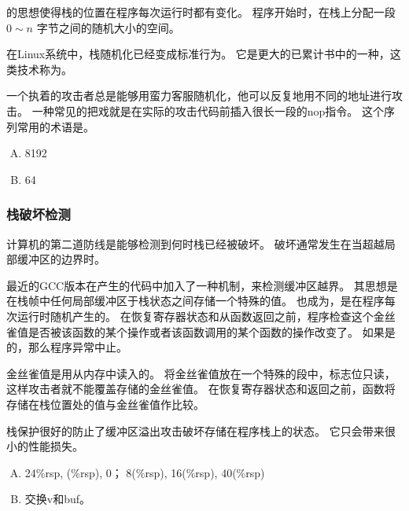 {{{            的思想使得栈的位置在程序每次运行时都有变化。
            程序开始时，在栈上分配一段 $0 \sim n$ 字节之间的随机大小的空间。

            在Linux系统中，栈随机化已经变成标准行为。
            它是更大的已累计书中的一种，这类技术称为。

            一个执着的攻击者总是能够用蛮力客服随机化，他可以反复地用不同的地址进行攻击。
            一种常见的把戏就是在实际的攻击代码前插入很长一段的nop指令。
            这个序列常用的术语是。

            \begin{practicec}
                \begin{enumerate}[A.]
                    \item 8192
                    \item 64
                \end{enumerate}
            \end{practicec}
        }

        \subsubsection{栈破坏检测}
        {
            计算机的第二道防线是能够检测到何时栈已经被破坏。
            破坏通常发生在当超越局部缓冲区的边界时。

            最近的GCC版本在产生的代码中加入了一种机制，来检测缓冲区越界。
            其思想是在栈帧中任何局部缓冲区于栈状态之间存储一个特殊的值。
            也成为，是在程序每次运行时随机产生的。
            在恢复寄存器状态和从函数返回之前，程序检查这个金丝雀值是否被该函数的某个操作或者该函数调用的某个函数的操作改变了。
            如果是的，那么程序异常中止。

            金丝雀值是用从内存中读入的。
            将金丝雀值放在一个特殊的段中，标志位只读，这样攻击者就不能覆盖存储的金丝雀值。
            在恢复寄存器状态和返回之前，函数将存储在栈位置处的值与金丝雀值作比较。

            栈保护很好的防止了缓冲区溢出攻击破坏存储在程序栈上的状态。
            它只会带来很小的性能损失。

            \begin{practicec}
                \begin{enumerate}[A.]
                    \item
                    {
                        24\%rsp, (\%rsp), 0；
                        8(\%rsp), 16(\%rsp), 40(\%rsp)
                    }
                    \item
                    {
                        交换v和buf。
                    }
                \end{enumerate}
            \end{practicec}
        }

}}
